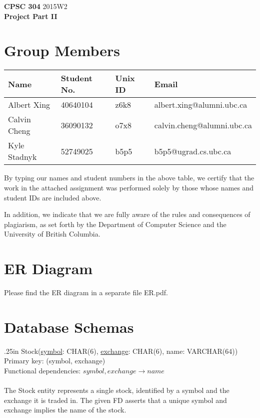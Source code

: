 \documentclass[letterpaper]{report}
\begin{document}
{\large \textbf{CPSC 304} 2015W2 \\ \textbf{Project Part II}}

\section*{Group Members}
\begin{tabular}{l l l l}
	\textbf{Name} & \textbf{Student No.} & \textbf{Unix ID} & \textbf{Email} \\ \hline
	Albert Xing & 40640104 & z6k8 & albert.xing@alumni.ubc.ca \\
	Calvin Cheng & 36090132 & o7x8 & calvin.cheng@alumni.ubc.ca \\
	Kyle Stadnyk & 52749025 & b5p5 & b5p5@ugrad.cs.ubc.ca
\end{tabular}

By typing our names and student numbers in the above table, we certify that the work in the attached assignment was performed solely by those whose names and student IDs are included above.

In addition, we indicate that we are fully aware of the rules and consequences of plagiarism, as set forth by the Department of Computer Science and the University of British Columbia.

\section*{ER Diagram}
Please find the ER diagram in a separate file {\sffamily ER.pdf}.

\section*{Database Schemas}

\hangindent .25in
{\sffamily Stock(\underline{symbol}: CHAR(6), \underline{exchange}: CHAR(6), name: VARCHAR(64))} \\
Primary key: {\sffamily (symbol, exchange)} \\
Functional dependencies: $symbol, exchange \to name$ \\\\
The {\sffamily Stock} entity represents a single stock, identified by a symbol and the exchange it is traded in. The given FD asserts that a unique symbol and exchange implies the name of the stock.
\end{document}
